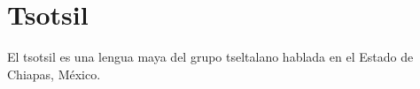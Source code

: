 \section*{Tsotsil}

\noindent El tsotsil es una lengua maya del grupo tseltalano hablada en el Estado de Chiapas, México.